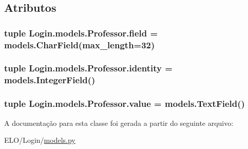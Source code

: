 \subsection{Atributos}
\hypertarget{classLogin_1_1models_1_1Professor_a732c4e12511e022f94847bed2950de5b}{
\subsubsection[{field}]{\setlength{\rightskip}{0pt plus 5cm}tuple Login.\-models.\-Professor.\-field = models.\-Char\-Field(max\-\_\-length=32)\hspace{0.3cm}{\ttfamily [static]}}}\label{dd/d57/classLogin_1_1models_1_1Professor_a732c4e12511e022f94847bed2950de5b}
\hypertarget{classLogin_1_1models_1_1Professor_a426ce75147797b70660e9c71d799166f}{
\subsubsection[{identity}]{\setlength{\rightskip}{0pt plus 5cm}tuple Login.\-models.\-Professor.\-identity = models.\-Integer\-Field()\hspace{0.3cm}{\ttfamily [static]}}}\label{dd/d57/classLogin_1_1models_1_1Professor_a426ce75147797b70660e9c71d799166f}
\hypertarget{classLogin_1_1models_1_1Professor_a8d594170d11268f64121bd2336bf2964}{
\subsubsection[{value}]{\setlength{\rightskip}{0pt plus 5cm}tuple Login.\-models.\-Professor.\-value = models.\-Text\-Field()\hspace{0.3cm}{\ttfamily [static]}}}\label{dd/d57/classLogin_1_1models_1_1Professor_a8d594170d11268f64121bd2336bf2964}


A documentação para esta classe foi gerada a partir do seguinte arquivo\-:\begin{DoxyCompactItemize}
\item 
E\-L\-O/\-Login/\hyperlink{Login_2models_8py}{models.\-py}\end{DoxyCompactItemize}
